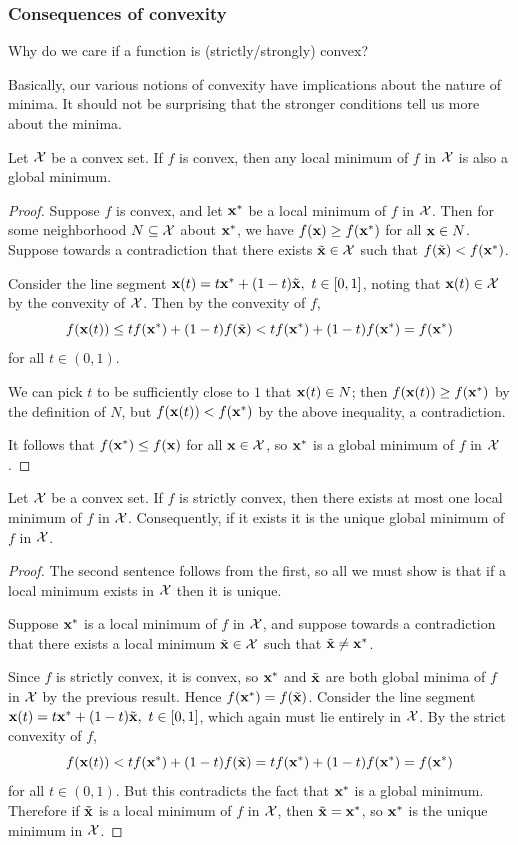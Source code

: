 \subsubsection{Consequences of convexity}
Why do we care if a function is (strictly/strongly) convex?

Basically, our various notions of convexity have implications about the nature of minima.
It should not be surprising that the stronger conditions tell us more about the minima.

\begin{proposition}
Let $\mathcal{X}$ be a convex set.
If $f$ is convex, then any local minimum of $f$ in $\mathcal{X}$ is also a global minimum.
\end{proposition}
\begin{proof}
Suppose $f$ is convex, and let $\mathbf{x}^*$ be a local minimum of $f$ in $\mathcal{X}$.
Then for some neighborhood $N \subseteq \mathcal{X}$ about $\mathbf{x}^*$, we have $f(\mathbf{x}) \geq f(\mathbf{x}^*)$ for all $\mathbf{x} \in N$.
Suppose towards a contradiction that there exists $\tilde{\mathbf{x}} \in \mathcal{X}$ such that $f(\tilde{\mathbf{x}}) < f(\mathbf{x}^*)$.

Consider the line segment $\mathbf{x}(t) = t\mathbf{x}^* + (1-t)\tilde{\mathbf{x}}, ~ t \in [0,1]$, noting that $\mathbf{x}(t) \in \mathcal{X}$ by the convexity of $\mathcal{X}$.
Then by the convexity of $f$,
\[f(\mathbf{x}(t)) \leq tf(\mathbf{x}^*) + (1-t)f(\tilde{\mathbf{x}}) < tf(\mathbf{x}^*) + (1-t)f(\mathbf{x}^*) = f(\mathbf{x}^*)\]
for all $t \in (0,1)$.

We can pick $t$ to be sufficiently close to $1$ that $\mathbf{x}(t) \in N$; then $f(\mathbf{x}(t)) \geq f(\mathbf{x}^*)$ by the definition of $N$, but $f(\mathbf{x}(t)) < f(\mathbf{x}^*)$ by the above inequality, a contradiction.

It follows that $f(\mathbf{x}^*) \leq f(\mathbf{x})$ for all $\mathbf{x} \in \mathcal{X}$, so $\mathbf{x}^*$ is a global minimum of $f$ in $\mathcal{X}$.
\end{proof}

\begin{proposition}
Let $\mathcal{X}$ be a convex set.
If $f$ is strictly convex, then there exists at most one local minimum of $f$ in $\mathcal{X}$.
Consequently, if it exists it is the unique global minimum of $f$ in $\mathcal{X}$.
\end{proposition}
\begin{proof}
The second sentence follows from the first, so all we must show is that if a local minimum exists in $\mathcal{X}$ then it is unique.

Suppose $\mathbf{x}^*$ is a local minimum of $f$ in $\mathcal{X}$, and suppose towards a contradiction that there exists a local minimum $\tilde{\mathbf{x}} \in \mathcal{X}$ such that $\tilde{\mathbf{x}} \neq \mathbf{x}^*$.

Since $f$ is strictly convex, it is convex, so $\mathbf{x}^*$ and $\tilde{\mathbf{x}}$ are both global minima of $f$ in $\mathcal{X}$ by the previous result.
Hence $f(\mathbf{x}^*) = f(\tilde{\mathbf{x}})$.
Consider the line segment $\mathbf{x}(t) = t\mathbf{x}^* + (1-t)\tilde{\mathbf{x}}, ~ t \in [0,1]$, which again must lie entirely in $\mathcal{X}$.
By the strict convexity of $f$,
\[f(\mathbf{x}(t)) < tf(\mathbf{x}^*) + (1-t)f(\tilde{\mathbf{x}}) = tf(\mathbf{x}^*) + (1-t)f(\mathbf{x}^*) = f(\mathbf{x}^*)\]
for all $t \in (0,1)$.
But this contradicts the fact that $\mathbf{x}^*$ is a global minimum.
Therefore if $\tilde{\mathbf{x}}$ is a local minimum of $f$ in $\mathcal{X}$, then $\tilde{\mathbf{x}} = \mathbf{x}^*$, so $\mathbf{x}^*$ is the unique minimum in $\mathcal{X}$.
\end{proof}

